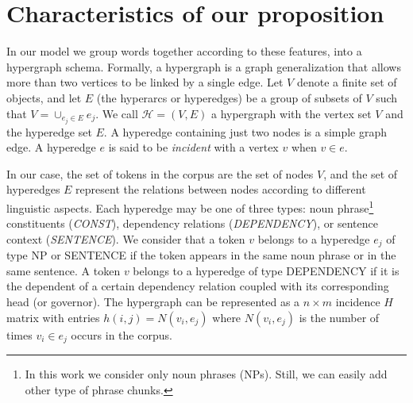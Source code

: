 \section{Characteristics of our proposition}
In our model we group words together according to these features, into a  hypergraph schema. Formally, a hypergraph \cite{Berge1985} is a graph generalization  that allows more than two vertices to be linked by a single edge. Let $V$ denote a finite set of objects, and let $E$  (the hyperarcs
or hyperedges) be a
group of subsets  of $V$ such that $V = \cup_{e_j \in E}e_j$. We call $\mathcal{H}=(V,E)$ a {hypergraph}
with the {vertex} set $V$ and the hyperedge set $E$. A
hyperedge containing just two nodes is a simple graph edge.
%
A hyperedge $e$ is said to be \emph{incident} with a vertex $v$ when
$v \in e$.


In our case, the set of tokens in the corpus are the set of nodes  $V$, and the set of hyperedges  $E$ represent the relations between nodes according to different linguistic aspects.
%
Each hyperedge may be one of three types: noun phrase\footnote{In this work we consider only noun phrases (NPs). Still, we can easily add other type of phrase chunks.}   constituents (\textit{CONST}), dependency relations (\textit{DEPENDENCY}), or sentence context (\textit{SENTENCE}). We consider that a token $v$ belongs to a hyperedge $e_j$ of type {NP} or {SENTENCE} if the token appears in the same noun phrase or in the same sentence. A token $v$ belongs to a hyperedge of type {DEPENDENCY} if it is the dependent of a certain dependency relation coupled with its corresponding head (or governor).	The hypergraph can be represented as a $n \times m$ incidence $H$ matrix with entries $h(i,j) = N(v_i, e_j)$ where $N(v_i, e_j)$ is the number of times $v_i \in e_j$ occurs in the corpus.


